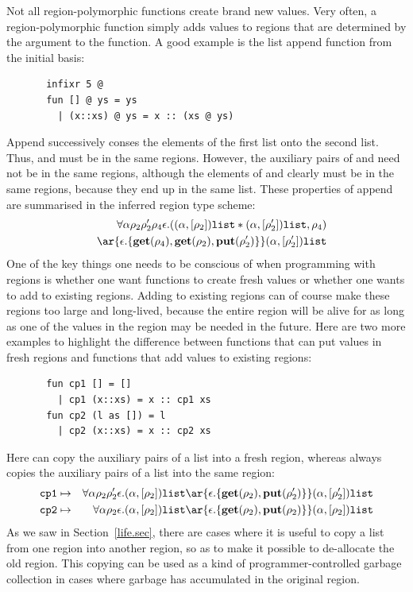 \documentclass[12pt]{book}
\begin{document}
Not all region-polymorphic functions create brand new values. Very often, a
region-polymorphic function simply adds values to regions that are determined
by the argument to the function. A good example is the list append function
from the initial basis:
\begin{verbatim}
       infixr 5 @
       fun [] @ ys = ys
         | (x::xs) @ ys = x :: (xs @ ys)
\end{verbatim}
Append successively conses the elements of the first list onto the second list.
Thus,  and  must be in the same regions. However, the auxiliary pairs of
  and  need not be in the same regions, although
the elements of  and  clearly must be in the same regions,
because they end up in the same list. These properties of append are summarised
in the inferred region type scheme:
\begin{eqnarray*}
&&\forall\alpha\rho_2\rho_2'\rho_4\epsilon.
   ( (\alpha,[\rho_2])\boxml{list} \ast
      (\alpha,[\rho_2'])\boxml{list}, \rho_4) \\ 
&&\ar{\epsilon.\{\Get(\rho_4),\Get(\rho_2),\Put(\rho_2')\}} (\alpha,[\rho_2'])\boxml{list}
\end{eqnarray*}
One of the key things one needs to be conscious of when programming
with regions is whether one want functions to create fresh values or
whether one wants to add to existing regions. Adding to existing
regions can of course make these regions too large and long-lived,
because the entire region will be alive for as long as one of the values
in the region may be needed in the future. Here are two more examples
to highlight the difference between functions that can put values in
fresh regions and functions that add values to existing regions:
\begin{verbatim}
       fun cp1 [] = []   
         | cp1 (x::xs) = x :: cp1 xs
       fun cp2 (l as []) = l
         | cp2 (x::xs) = x :: cp2 xs
\end{verbatim}
Here  can copy the auxiliary pairs of a list into a fresh region, whereas  always
copies the auxiliary pairs of a list into the same region:
\begin{eqnarray*}
\boxml{cp1}&\mapsto&\forall\alpha\rho_2\rho_2'\epsilon.
     (\alpha,[\rho_2])\boxml{list} \ar{\epsilon.\{\Get(\rho_2),
           \Put(\rho_2')\}} (\alpha,[\rho_2'])\boxml{list}\\
\boxml{cp2}&\mapsto&\forall\alpha\rho_2\epsilon.
     (\alpha,[\rho_2])\boxml{list} \ar{\epsilon.\{\Get(\rho_2),
           \Put(\rho_2)\}} (\alpha,[\rho_2])\boxml{list}
\end{eqnarray*}
As we saw in Section~\ref{life.sec}, there are cases where it is useful to copy a list from one region into another region,
so as to make it possible to de-allocate the old region. This copying can be used
as a kind of programmer-controlled garbage collection in cases where garbage has accumulated
in the original region. 
\end{document}

